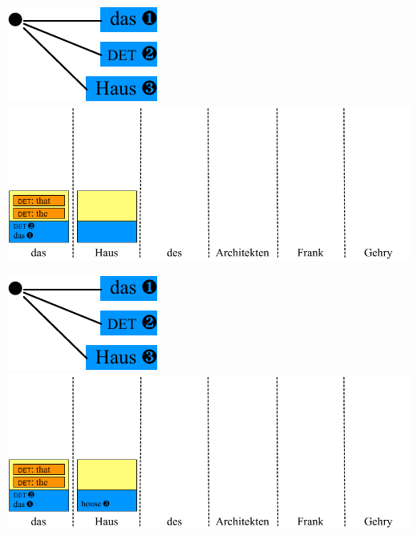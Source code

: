 \documentclass[landscape]{slides}
\begin{document}
\begin{center}\vspace{7mm}
\includegraphics[scale=1.4]{accessing-grammar-rules-prefix-early3.pdf}\\[19mm]
\includegraphics[scale=1.4]{accessing-grammar-rules-early-example4.pdf}
\end{center}


\begin{center}\vspace{7mm}
\includegraphics[scale=1.4]{accessing-grammar-rules-prefix-early3.pdf}\\[19mm]
\includegraphics[scale=1.4]{accessing-grammar-rules-early-example5.pdf}
\end{center}
\end{document}
